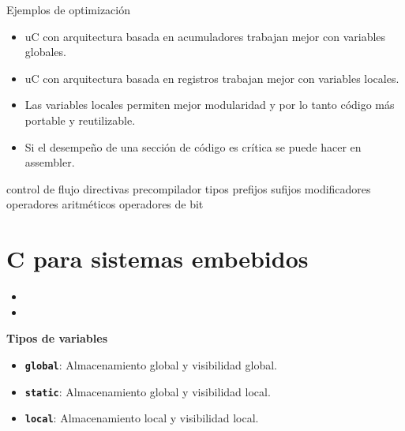 \documentclass[aspectratio=169]{beamer}
\begin{document}
\begin{frame}{Ejemplos de optimización}
  \begin{itemize}
    \item uC con arquitectura basada en acumuladores trabajan mejor con variables globales.
    \vspace{10px}
    \item uC con arquitectura basada en registros trabajan mejor con variables locales.
    \vspace{10px}
    \item Las variables locales permiten mejor modularidad y por lo tanto código más portable y reutilizable.
    \vspace{10px}
    \item Si el desempeño de una sección de código es crítica se puede hacer en assembler.
  \end{itemize}
\end{frame}


\begin{frame}
control de flujo
directivas precompilador
tipos
prefijos sufijos
modificadores 
operadores aritméticos
operadores de bit

\end{frame}

\section{C para sistemas embebidos}

\begin{frame}{}
	\begin{itemize}
		\item
		\vspace{5px}
		\item
	\end{itemize}
\end{frame}


\begin{frame}{\textbf{Tipos de variables}}
	\begin{itemize}
		\item \textbf{\texttt{global}}: Almacenamiento global y visibilidad global.
		\vspace{5px}
		\item \textbf{\texttt{static}}: Almacenamiento global y visibilidad local.
		\vspace{5px}
		\item \textbf{\texttt{local}}: Almacenamiento local y visibilidad local.
	\end{itemize}
\end{frame}
\end{document}
